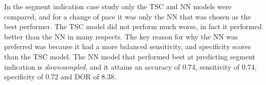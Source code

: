 In the segment indication case study only the TSC and NN models were compared, and for a change of pace it was only the NN that was chosen as the best performer. 
The TSC model did not perform much worse, in fact it performed better than the NN in many respects. 
The key reason for why the NN was preferred was because it had a more balanced sensitivity, and specificity scores than the TSC model. 
The NN model that performed best at predicting segment indication is \textit{downsampled}, and it attains an
accuracy of 0.74, sensitivity of 0.74, specificity of 0.72 and DOR of 8.38. 
